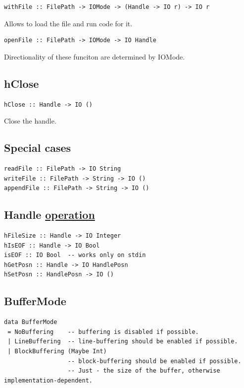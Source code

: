 \documentclass[a4paper,14pt,oneside]{book}
\begin{document}
\begin{verbatim}
withFile :: FilePath -> IOMode -> (Handle -> IO r) -> IO r
\end{verbatim}

Allows to load the file and run code for it.

\begin{verbatim}
openFile :: FilePath -> IOMode -> IO Handle
\end{verbatim}

Directionality of these funciton are determined by IOMode.

\subsection{hClose}
\label{sec:org1022a57}

\begin{verbatim}
hClose :: Handle -> IO ()
\end{verbatim}

Close the handle.

\subsection{Special cases}
\label{sec:orgf8e8823}

\begin{verbatim}
readFile :: FilePath -> IO String
writeFile :: FilePath -> String -> IO ()
appendFile :: FilePath -> String -> IO ()
\end{verbatim}

\subsection{Handle \hyperref[org8c71e94]{operation}}
\label{sec:org4b17953}

\begin{verbatim}
hFileSize :: Handle -> IO Integer
hIsEOF :: Handle -> IO Bool
isEOF :: IO Bool  -- works only on stdin
hGetPosn :: Handle -> IO HandlePosn
hSetPosn :: HandlePosn -> IO ()
\end{verbatim}

\subsection{BufferMode}
\label{sec:org5882efa}

\begin{verbatim}
data BufferMode
 = NoBuffering    -- buffering is disabled if possible.
 | LineBuffering  -- line-buffering should be enabled if possible.
 | BlockBuffering (Maybe Int)
                  -- block-buffering should be enabled if possible.
                  -- Just - the size of the buffer, otherwise implementation-dependent.
\end{verbatim}
\end{document}
